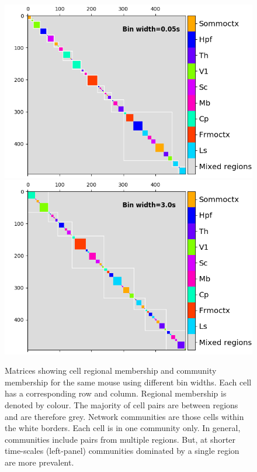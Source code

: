 \documentclass[a4paper,12pt]{article}
\theoremstyle{definition}
\begin{document}
\begin{figure}[t!]
    \centering
    \includegraphics[width=0.45\columnwidth]{images/Krebs_0p05_regional_cluster_map.png}
    \includegraphics[width=0.45\columnwidth]{images/Krebs_3p0_regional_cluster_map.png}
    \vspace{-0.3cm}
    \caption{Matrices showing cell regional membership and community membership for the same mouse using different bin widths. Each cell has a corresponding row and column. Regional membership is denoted by colour. The majority of cell pairs are between regions and are therefore grey. Network communities are those cells within the white borders. Each cell is in one community only. In general, communities include pairs from multiple regions. But, at shorter time-scales (left-panel) communities dominated by a single region are more prevalent.}
    \vspace{-0.6cm}
    \label{fig:regional_cluster_maps}
\end{figure}


\vspace{-0.6cm}
\renewcommand\refname{\normalsize References \vspace{-0.5cm}}



\end{document}
